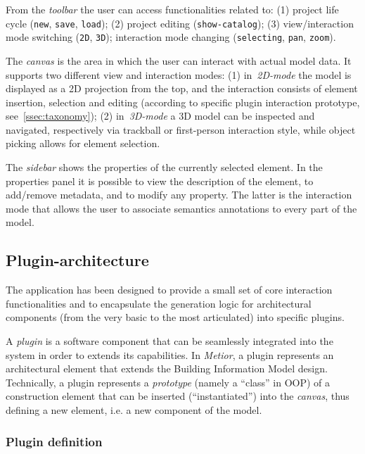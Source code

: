 From the \emph{toolbar} the user can access functionalities related to: (1) project life cycle ({\tt new}, {\tt save}, {\tt load}); (2) project editing  ({\tt  show-catalog}); (3) view/interaction mode switching ({\tt 2D}, {\tt  3D}); interaction mode changing ({\tt  selecting}, {\tt pan}, {\tt zoom}).


The \emph{canvas} is the area in which the user can interact with actual model data. It supports two different view and interaction modes: (1) in~\emph{2D-mode} the model is displayed as a 2D projection from the top, and the interaction consists of element insertion, selection and editing (according to specific plugin interaction prototype, see~\ref{ssec:taxonomy}); (2) in~\emph{3D-mode} a 3D model can be inspected and navigated, respectively via trackball or first-person interaction style, while object picking allows for element selection.

The \emph{sidebar} shows the properties of the currently selected element.
In the properties panel it is possible to view the description of the element, to add/remove metadata, and to modify any property. The latter is the interaction mode that allows the user to associate semantics annotations to every part of the model.

\vspace{-3mm}\subsection{Plugin-architecture}\vspace{-3mm}

\noindent The application has been designed to provide a small set of core interaction functionalities and to encapsulate the generation logic for architectural components (from the very basic to the most articulated) into specific plugins.

A \emph{plugin} is a software component that can be seamlessly integrated into the system in order to extends its capabilities.
In \emph{Metior}, a plugin represents an architectural element that extends the Building Information Model design.
Technically, a plugin represents a \emph{prototype} (namely a ``class'' in OOP) of a construction element that can be inserted (``instantiated'') into the \emph{canvas}, thus defining a new element, i.e. a new component of the model.

\subsubsection{Plugin definition}

